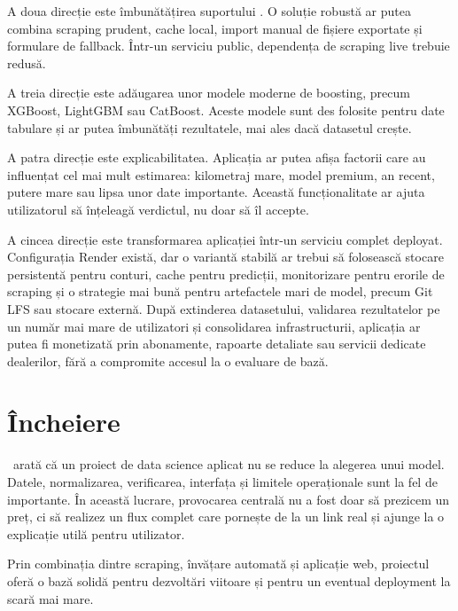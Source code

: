 A doua direcție este îmbunătățirea suportului \mobilede. O soluție robustă ar putea combina scraping prudent, cache local, import manual de fișiere exportate și formulare de fallback. Într-un serviciu public, dependența de scraping live trebuie redusă.

A treia direcție este adăugarea unor modele moderne de boosting, precum XGBoost, LightGBM sau CatBoost. Aceste modele sunt des folosite pentru date tabulare și ar putea îmbunătăți rezultatele, mai ales dacă datasetul crește.

A patra direcție este explicabilitatea. Aplicația ar putea afișa factorii care au influențat cel mai mult estimarea: kilometraj mare, model premium, an recent, putere mare sau lipsa unor date importante. Această funcționalitate ar ajuta utilizatorul să înțeleagă verdictul, nu doar să îl accepte.

A cincea direcție este transformarea aplicației într-un serviciu complet deployat. Configurația Render există, dar o variantă stabilă ar trebui să folosească stocare persistentă pentru conturi, cache pentru predicții, monitorizare pentru erorile de scraping și o strategie mai bună pentru artefactele mari de model, precum Git LFS sau stocare externă. După extinderea datasetului, validarea rezultatelor pe un număr mai mare de utilizatori și consolidarea infrastructurii, aplicația ar putea fi monetizată prin abonamente, rapoarte detaliate sau servicii dedicate dealerilor, fără a compromite accesul la o evaluare de bază.

\section{Încheiere}
\label{sec:conclusions-closing}

\project\ arată că un proiect de data science aplicat nu se reduce la alegerea unui model. Datele, normalizarea, verificarea, interfața și limitele operaționale sunt la fel de importante. În această lucrare, provocarea centrală nu a fost doar să prezicem un preț, ci să realizez un flux complet care pornește de la un link real și ajunge la o explicație utilă pentru utilizator.

Prin combinația dintre scraping, învățare automată și aplicație web, proiectul oferă o bază solidă pentru dezvoltări viitoare și pentru un eventual deployment la scară mai mare.
